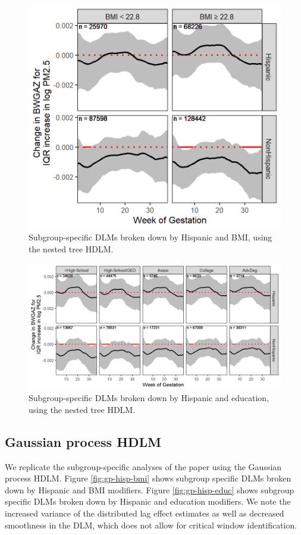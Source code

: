 \documentclass[12pt]{article}
\begin{document}
\begin{figure}[!ht]
    \centering
    \includegraphics[width=.5\textwidth]{supp-img/nested_hisp_bmi.png}
    \caption{Subgroup-specific DLMs broken down by Hispanic and BMI, using the nested tree HDLM.}
    \label{fig:nested-hisp-bmi}
\end{figure}
\begin{figure}[!ht]
    \centering
    \includegraphics[width=.9\textwidth]{supp-img/nested_hisp_edu.png}
    \caption{Subgroup-specific DLMs broken down by Hispanic and education, using the nested tree HDLM.}
    \label{fig:nested-hisp-educ}
\end{figure}

\clearpage

\subsection{Gaussian process HDLM}
We replicate the subgroup-specific analyses of the paper using the Gaussian process HDLM. Figure \ref{fig:gp-hisp-bmi} shows subgroup specific DLMs broken down by Hispanic and BMI modifiers. Figure \ref{fig:gp-hisp-educ} shows subgroup specific DLMs broken down by Hispanic and education modifiers. We note the increased variance of the distributed lag effect estimates as well as decreased smoothness in the DLM, which does not allow for critical window identification.
\end{document}
